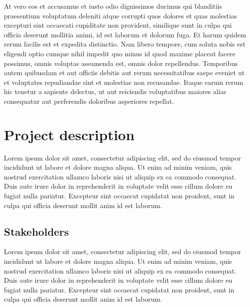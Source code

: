\noindent At vero eos et accusamus et iusto odio dignissimos ducimus qui blanditiis praesentium voluptatum deleniti atque corrupti quos dolores et quas molestias excepturi sint occaecati cupiditate non provident, similique sunt in culpa qui officia deserunt mollitia animi, id est laborum et dolorum fuga. Et harum quidem rerum facilis est et expedita distinctio. Nam libero tempore, cum soluta nobis est eligendi optio cumque nihil impedit quo minus id quod maxime placeat facere possimus, omnis voluptas assumenda est, omnis dolor repellendus. Temporibus autem quibusdam et aut officiis debitis aut rerum necessitatibus saepe eveniet ut et voluptates repudiandae sint et molestiae non recusandae. Itaque earum rerum hic tenetur a sapiente delectus, ut aut reiciendis voluptatibus maiores alias consequatur aut perferendis doloribus asperiores repellat.

\section{Project description}

Lorem ipsum dolor sit amet, consectetur adipiscing elit, sed do eiusmod tempor incididunt ut labore et dolore magna aliqua. Ut enim ad minim veniam, quis nostrud exercitation ullamco laboris nisi ut aliquip ex ea commodo consequat. Duis aute irure dolor in reprehenderit in voluptate velit esse cillum dolore eu fugiat nulla pariatur. Excepteur sint occaecat cupidatat non proident, sunt in culpa qui officia deserunt mollit anim id est laborum.


\subsection{Stakeholders}

Lorem ipsum dolor sit amet, consectetur adipiscing elit, sed do eiusmod tempor incididunt ut labore et dolore magna aliqua. Ut enim ad minim veniam, quis nostrud exercitation ullamco laboris nisi ut aliquip ex ea commodo consequat. Duis aute irure dolor in reprehenderit in voluptate velit esse cillum dolore eu fugiat nulla pariatur. Excepteur sint occaecat cupidatat non proident, sunt in culpa qui officia deserunt mollit anim id est laborum.